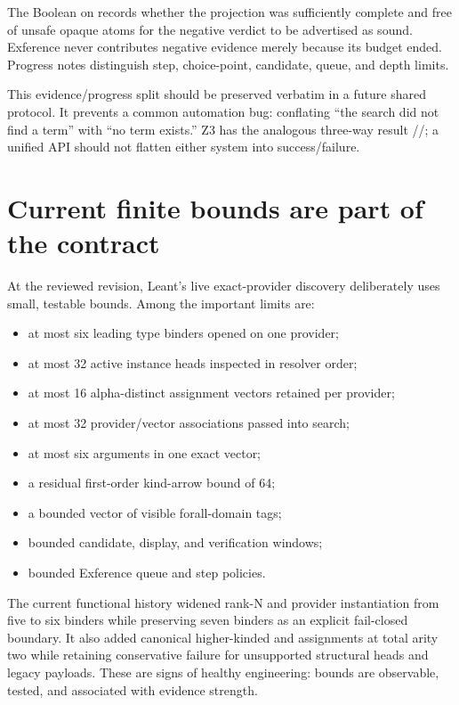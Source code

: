 \documentclass[11pt,letterpaper,openany]{report}
\newcommand{\code}[1]{\texttt{\detokenize{#1}}}
\begin{document}
The Boolean on \code{SynthRefuted} records whether the projection was sufficiently
complete and free of unsafe opaque atoms for the negative verdict to be advertised as
sound. Exference never contributes negative evidence merely because its budget ended.
Progress notes distinguish step, choice-point, candidate, queue, and depth limits.

This evidence/progress split should be preserved verbatim in a future shared protocol.
It prevents a common automation bug: conflating ``the search did not find a term'' with
``no term exists.'' Z3 has the analogous three-way result
\code{sat}/\code{unsat}/\code{unknown}; a unified API should not flatten either
system into success/failure.

\section{Current finite bounds are part of the contract}

At the reviewed revision, Leant's live exact-provider discovery deliberately uses
small, testable bounds. Among the important limits are:

\begin{itemize}
  \item at most six leading type binders opened on one provider;
  \item at most 32 active instance heads inspected in resolver order;
  \item at most 16 alpha-distinct assignment vectors retained per provider;
  \item at most 32 provider/vector associations passed into search;
  \item at most six arguments in one exact vector;
  \item a residual first-order kind-arrow bound of 64;
  \item a bounded vector of visible forall-domain tags;
  \item bounded candidate, display, and verification windows;
  \item bounded Exference queue and step policies.
\end{itemize}

The current functional history widened rank-N and provider instantiation from five to
six binders while preserving seven binders as an explicit fail-closed boundary. It
also added canonical higher-kinded \code{Prod} and \code{Sum} assignments at total
arity two while retaining conservative failure for unsupported structural heads and
legacy payloads. These are signs of healthy engineering: bounds are observable,
tested, and associated with evidence strength.
\end{document}
